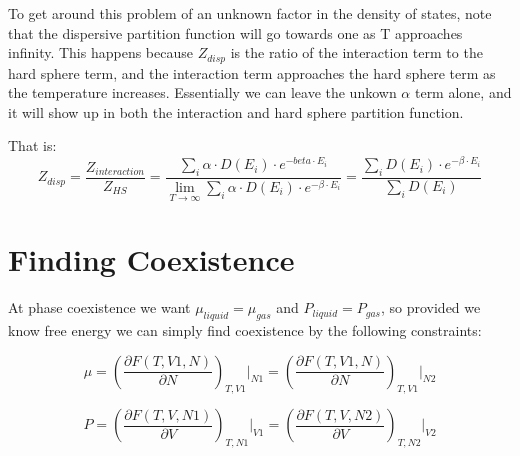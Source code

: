 To get around this problem of an unknown factor in the density of states, note that the dispersive partition function will go towards one as T approaches infinity. This happens because $Z_{disp}$ is the ratio of the interaction term to the hard sphere term, and the interaction term approaches the hard sphere term as the temperature increases. Essentially we can leave the unkown $\alpha$ term alone, and it will show up in both the interaction and hard sphere partition function.

That is: $$Z_{disp}=\frac{Z_{interaction}}{Z_{HS}}=\frac{\sum_i \alpha\cdot D(E_i)\cdot e^{-beta\cdot E_i}}{\lim_{T\to\infty}\sum_i \alpha\cdot D(E_i)\cdot e^{-\beta\cdot E_i}}=\frac{\sum_i D(E_i)\cdot e^{-\beta\cdot E_i}}{\sum_i D(E_i)}$$
\newpage
\section{Finding Coexistence}
At phase coexistence we want $\mu_{liquid}=\mu_{gas}$ and $P_{liquid}=P_{gas}$, so provided we know free energy we can simply find coexistence by the following constraints:

\begin{equation}\label{eq:methodsMu}
\mu=\left(\frac{\partial F(T,V1,N)}{\partial N}\right)_{T,V1}\Bigr|_{N1}=\left(\frac{\partial F(T,V1,N)}{\partial N}\right)_{T,V1}\Bigr|_{N2}
\end{equation}

\begin{equation}\label{eq:methodsP}
P=\left(\frac{\partial F(T,V,N1)}{\partial V}\right)_{T,N1}\Bigr|_{V1}=\left(\frac{\partial F(T,V,N2)}{\partial V}\right)_{T,N2}\Bigr|_{V2}
\end{equation}

